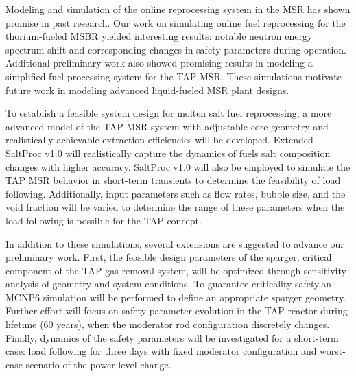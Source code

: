 Modeling and simulation of the online reprocessing system in the \gls{MSR} 
has shown promise in past research. Our work on simulating online fuel  
reprocessing for the thorium-fueled \gls{MSBR} yielded interesting results: 
notable neutron energy spectrum shift and corresponding changes in safety 
parameters during operation. Additional preliminary work also showed promising
results in modeling a simplified fuel processing system for the \gls{TAP} 
\gls{MSR}. These simulations motivate future work in modeling advanced 
liquid-fueled \gls{MSR} plant designs.

To establish a feasible system design for molten salt fuel reprocessing, a 
more advanced model of the \gls{TAP} \gls{MSR} system with adjustable core 
geometry and realistically achievable extraction efficiencies will be 
developed. Extended SaltProc v1.0 will realistically capture the dynamics of 
fuels salt composition changes with higher accuracy. SaltProc v1.0 will also 
be employed to simulate the \gls{TAP} \gls{MSR} behavior in short-term 
transients to determine the feasibility of load following. Additionally, input 
parameters such as flow rates, bubble size, and the void fraction will be 
varied to determine the range of these parameters when the load following is 
possible for the \gls{TAP} concept.

In addition to these simulations, several extensions are suggested to 
advance our preliminary work. First, the feasible design parameters of the 
sparger, critical component of the \gls{TAP} gas removal system, will be 
optimized through sensitivity analysis of geometry and system conditions. To 
guarantee criticality safety,an MCNP6 simulation will be performed to define 
an appropriate sparger geometry. Further effort will focus on safety  
parameter evolution in the \gls{TAP} reactor during lifetime (60 years),  
when the moderator rod configuration discretely changes. Finally, dynamics of 
the safety parameters will be investigated for a short-term case: load 
following for three days with fixed moderator configuration and worst-case 
scenario of the power level change. 

